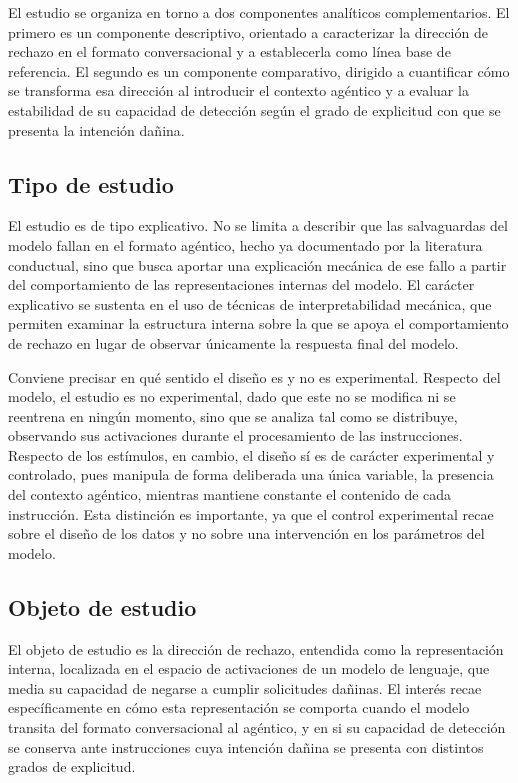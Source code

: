 \documentclass[12pt,a4paper]{article}
\begin{document}
El estudio se organiza en torno a dos componentes analíticos complementarios. El primero es un componente descriptivo, orientado a caracterizar la dirección de rechazo en el formato conversacional y a establecerla como línea base de referencia. El segundo es un componente comparativo, dirigido a cuantificar cómo se transforma esa dirección al introducir el contexto agéntico y a evaluar la estabilidad de su capacidad de detección según el grado de explicitud con que se presenta la intención dañina.

\subsection{Tipo de estudio}

\justifying

El estudio es de tipo explicativo. No se limita a describir que las salvaguardas del modelo fallan en el formato agéntico, hecho ya documentado por la literatura conductual, sino que busca aportar una explicación mecánica de ese fallo a partir del comportamiento de las representaciones internas del modelo. El carácter explicativo se sustenta en el uso de técnicas de interpretabilidad mecánica, que permiten examinar la estructura interna sobre la que se apoya el comportamiento de rechazo en lugar de observar únicamente la respuesta final del modelo.

Conviene precisar en qué sentido el diseño es y no es experimental. Respecto del modelo, el estudio es no experimental, dado que este no se modifica ni se reentrena en ningún momento, sino que se analiza tal como se distribuye, observando sus activaciones durante el procesamiento de las instrucciones. Respecto de los estímulos, en cambio, el diseño sí es de carácter experimental y controlado, pues manipula de forma deliberada una única variable, la presencia del contexto agéntico, mientras mantiene constante el contenido de cada instrucción. Esta distinción es importante, ya que el control experimental recae sobre el diseño de los datos y no sobre una intervención en los parámetros del modelo.

\subsection{Objeto de estudio}

\justifying

El objeto de estudio es la dirección de rechazo, entendida como la representación interna, localizada en el espacio de activaciones de un modelo de lenguaje, que media su capacidad de negarse a cumplir solicitudes dañinas. El interés recae específicamente en cómo esta representación se comporta cuando el modelo transita del formato conversacional al agéntico, y en si su capacidad de detección se conserva ante instrucciones cuya intención dañina se presenta con distintos grados de explicitud.
\end{document}

